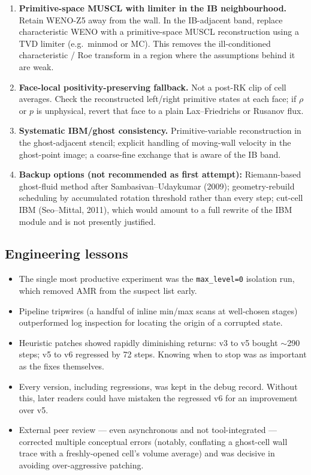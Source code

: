\begin{enumerate}
  \item \textbf{Primitive-space MUSCL with limiter in the IB neighbourhood.}
    Retain WENO-Z5 away from the wall. In the IB-adjacent band, replace
    characteristic WENO with a primitive-space MUSCL reconstruction using a
    TVD limiter (e.g.\ minmod or MC). This removes the ill-conditioned
    characteristic / Roe transform in a region where the assumptions behind
    it are weak.
  \item \textbf{Face-local positivity-preserving fallback.}
    Not a post-RK clip of cell averages. Check the reconstructed left/right
    primitive states at each face; if $\rho$ or $p$ is unphysical, revert
    that face to a plain Lax--Friedrichs or Rusanov flux.
  \item \textbf{Systematic IBM/ghost consistency.} Primitive-variable
    reconstruction in the ghost-adjacent stencil; explicit handling of
    moving-wall velocity in the ghost-point image; a coarse-fine exchange
    that is aware of the IB band.
  \item \textbf{Backup options (not recommended as first attempt):}
    Riemann-based ghost-fluid method after Sambasivan--Udaykumar (2009);
    geometry-rebuild scheduling by accumulated rotation threshold rather
    than every step; cut-cell IBM (Seo--Mittal, 2011), which would amount to
    a full rewrite of the IBM module and is not presently justified.
\end{enumerate}

\subsection{Engineering lessons}

\begin{itemize}
  \item The single most productive experiment was the \texttt{max\_level=0}
        isolation run, which removed AMR from the suspect list early.
  \item Pipeline tripwires (a handful of inline min/max scans at
        well-chosen stages) outperformed log inspection for locating the
        origin of a corrupted state.
  \item Heuristic patches showed rapidly diminishing returns: v3 to v5
        bought $\sim$290 steps; v5 to v6 regressed by 72 steps. Knowing when
        to stop was as important as the fixes themselves.
  \item Every version, including regressions, was kept in the debug record.
        Without this, later readers could have mistaken the regressed v6 for
        an improvement over v5.
  \item External peer review --- even asynchronous and not tool-integrated
        --- corrected multiple conceptual errors (notably, conflating a
        ghost-cell wall trace with a freshly-opened cell's volume average)
        and was decisive in avoiding over-aggressive patching.
\end{itemize}

